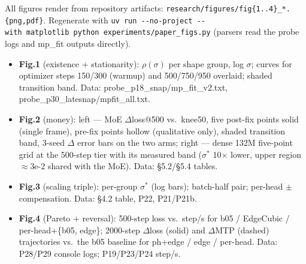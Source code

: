 \documentclass[
]{article}
\providecommand{\tightlist}{%
  \setlength{\itemsep}{0pt}\setlength{\parskip}{0pt}}
\begin{document}
All figures render from repository artifacts:
\texttt{research/figures/fig\{1..4\}\_*.\{png,pdf\}}. Regenerate with
\texttt{uv\ run\ -\/-no-project\ -\/-with\ matplotlib\ python\ experiments/paper\_figs.py}
(parsers read the probe logs and mp\_fit outputs directly).

\begin{itemize}
\tightlist
\item
  \textbf{Fig.1} (existence + stationarity): \(\rho(\sigma)\) per shape
  group, log \(\sigma\); curves for optimizer steps 150/300 (warmup) and
  500/750/950 overlaid; shaded transition band. Data:
  probe\_p18\_snap/mp\_fit\_v2.txt, probe\_p30\_latesnap/mpfit\_all.txt.
\item
  \textbf{Fig.2} (money): left --- MoE \(\Delta\){}loss@500
  vs.~knee50, five post-fix points solid (single frame), pre-fix points
  hollow (qualitative only), shaded transition band, 3-seed \(\Delta\)
  error bars on the two arms; right --- dense 132M five-point grid at
  the 500-step tier with its measured band (\(\sigma^*\) 10\(\times\)
  lower, upper region \(\approx\){}3e-2 shared with the MoE). Data:
  §5.2/§5.4 tables.
\item
  \textbf{Fig.3} (scaling triple): per-group \(\sigma^*\) (log bars);
  batch-half pair; per-head \(\pm\) compensation. Data: §4.2 table, P22,
  P21/P21b.
\item
  \textbf{Fig.4} (Pareto + reversal): 500-step loss vs.~step/s for b05 /
  EdgeCubic / per-head+\{b05, edge\}; 2000-step \(\Delta\){}loss
  (solid) and \(\Delta\){}MTP (dashed) trajectories vs.~the b05
  baseline for ph+edge / edge / per-head. Data: P28/P29 console logs;
  P19/P23/P24 step/s.
\end{itemize}
\end{document}
